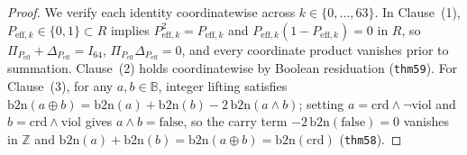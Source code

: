 \documentclass[11pt,letterpaper]{article}
\theoremstyle{spectralthm}
\begin{document}
\begin{proof}
We verify each identity coordinatewise across $k \in \{0,\dots,63\}$. In Clause~(1), $P_{\mathrm{eff},k} \in \{0,1\} \subset R$ implies $P_{\mathrm{eff},k}^2 = P_{\mathrm{eff},k}$ and $P_{\mathrm{eff},k}(1 - P_{\mathrm{eff},k}) = 0$ in $R$, so $\Pi_{P_{\mathrm{eff}}} + \Delta_{P_{\mathrm{eff}}} = I_{64}$, $\Pi_{P_{\mathrm{eff}}}\Delta_{P_{\mathrm{eff}}} = 0$, and every coordinate product vanishes prior to summation. Clause~(2) holds coordinatewise by Boolean residuation (\texttt{thm59}). For Clause~(3), for any $a, b \in \mathbb{B}$, integer lifting satisfies $\mathrm{b2n}(a \oplus b) = \mathrm{b2n}(a) + \mathrm{b2n}(b) - 2\,\mathrm{b2n}(a \wedge b)$; setting $a = \mathrm{crd}\wedge\neg\mathrm{viol}$ and $b = \mathrm{crd}\wedge\mathrm{viol}$ gives $a \wedge b = \mathrm{false}$, so the carry term $-2\,\mathrm{b2n}(\mathrm{false}) = 0$ vanishes in $\mathbb{Z}$ and $\mathrm{b2n}(a) + \mathrm{b2n}(b) = \mathrm{b2n}(a \oplus b) = \mathrm{b2n}(\mathrm{crd})$ (\texttt{thm58}).
\end{proof}
\end{document}
